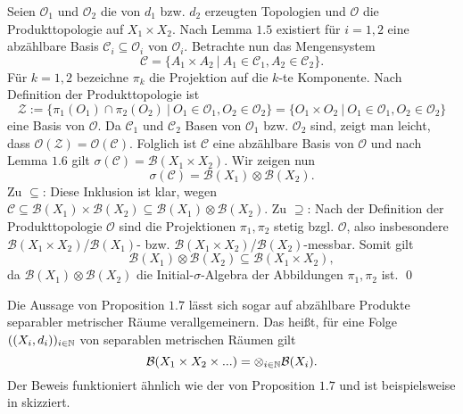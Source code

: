 \begin{proof*}
    Seien $\mathcal{O}_1$ und $\mathcal{O}_2$ die von $d_1$ bzw. $d_2$ erzeugten Topologien und $\mathcal{O}$ die Produkttopologie auf $X_1 \times X_2$. 
    Nach Lemma $1.5$ existiert für $i=1,2$ eine abzählbare Basis $\mathcal{C}_i \subseteq \mathcal{O}_i$ von $\mathcal{O}_i$. Betrachte nun das Mengensystem 
    $$
        \mathcal{C} = \{A_1 \times A_2 \ | \ A_1 \in \mathcal{C}_1, A_2 \in \mathcal{C}_2 \}. 
    $$
    Für $k=1,2$ bezeichne $\pi_k$ die Projektion auf die $k$-te Komponente. Nach Definition der Produkttopologie ist
    $$
        \mathcal{Z} := \{ \pi_1(O_1) \cap \pi_2(O_2) \ | \ O_1 \in \mathcal{O}_1, O_2 \in \mathcal{O}_2 \} = \{O_1 \times O_2 \ | \ O_1 \in \mathcal{O}_1, O_2 \in \mathcal{O}_2 \}
    $$
    eine Basis von $\mathcal{O}$. Da $\mathcal{C}_1$ und $\mathcal{C}_2$ Basen von $\mathcal{O}_1$ bzw. $\mathcal{O}_2$ sind, zeigt man leicht, dass $\mathcal{O}(\mathcal{Z}) = \mathcal{O}(\mathcal{C})$. 
    Folglich ist $\mathcal{C}$ eine abzählbare Basis von $\mathcal{O}$ und nach Lemma $1.6$ gilt $\sigma(\mathcal{C}) = \mathcal{B}(X_1 \times X_2)$. 
    Wir zeigen nun
    $$
        \sigma(\mathcal{C}) = \mathcal{B}(X_1) \otimes \mathcal{B}(X_2). 
    $$
    Zu $\subseteq$: Diese Inklusion ist klar, wegen $\mathcal{C} \subseteq \mathcal{B}(X_1) \times \mathcal{B}(X_2) \subseteq \mathcal{B}(X_1) \otimes \mathcal{B}(X_2)$. \newline
    Zu $\supseteq$: Nach der Definition der Produkttopologie $\mathcal{O}$ sind die Projektionen $\pi_1, \pi_2$ stetig bzgl. $\mathcal{O}$, also insbesondere $\mathcal{B}(X_1 \times X_2)$/$\mathcal{B}(X_1)$- bzw. $\mathcal{B}(X_1 \times X_2)$/$\mathcal{B}(X_2)$-messbar. 
    Somit gilt 
    $$
    \mathcal{B}(X_1) \otimes \mathcal{B}(X_2) \subseteq \mathcal{B}(X_1 \times X_2),
    $$
    da $\mathcal{B}(X_1) \otimes \mathcal{B}(X_2)$ die Initial-$\sigma$-Algebra der Abbildungen $\pi_1, \pi_2$ ist. 
    \qed
\end{proof*}

\begin{remark}
    Die Aussage von Proposition $1.7$ lässt sich sogar auf abzählbare Produkte separabler metrischer Räume verallgemeinern. 
    Das heißt, für eine Folge $((X_i, d_i))_{i \in \mathbb{N}}$ von separablen metrischen Räumen gilt
    $$
        \mathcal{B}(X_1 \times X_2 \times ...) = \otimes_{i \in \mathbb{N}}\mathcal{B}(X_i).
    $$
    Der Beweis funktioniert ähnlich wie der von Proposition $1.7$ und ist beispielsweise in \cite[Lemma 1.2]{kallenberg} skizziert. 
\end{remark}
  